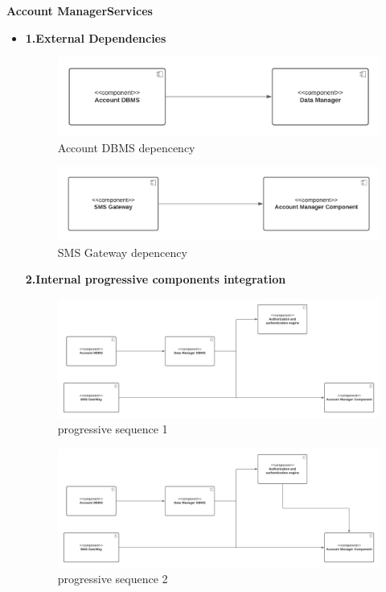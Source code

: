 \textbf{Account ManagerServices}
\begin{itemize}
    \item \textbf{1.External Dependencies}
    \begin{figure}[h!]
        \centering
        \includegraphics[width=.8\textwidth]{Images/TestDiagram/Account/ExternalDependenciesDBMS.png}
        \caption{\label{fig:AccountExternalDepDBMS}{Account DBMS depencency}}
    \end{figure}
    \FloatBarrier  
    
    \begin{figure}[h!]
        \centering
        \includegraphics[width=.8\textwidth]{Images/TestDiagram/Account/ExternalDependenciesSMS.png}
        \caption{\label{fig:AccountExternalDepSMS}{SMS Gateway depencency}}
    \end{figure}
    \FloatBarrier  
    \textbf{2.Internal progressive components integration}
    \begin{figure}[h!]
        \centering
        \includegraphics[width=1\textwidth]{Images/TestDiagram/Account/subAccount1.png}
        \caption{\label{fig:progressiveAccount1}{progressive sequence 1}}
    \end{figure}
    \FloatBarrier 
    \begin{figure}[h!]
        \centering
        \includegraphics[width=1\textwidth]{Images/TestDiagram/Account/subAccount2.png}
        \caption{\label{fig:progressiveAccount1}{progressive sequence 2}}
    \end{figure}
    \FloatBarrier 

\end{itemize}


